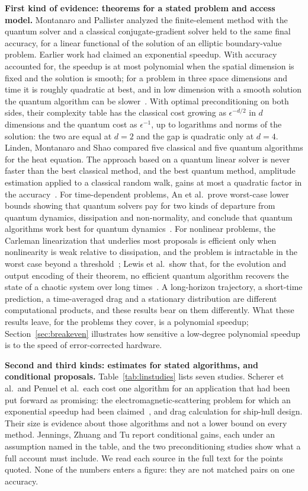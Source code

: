 \textbf{First kind of evidence: theorems for a stated problem and access model.} Montanaro and Pallister analyzed the finite-element method with the quantum solver and a classical conjugate-gradient solver held to the same final accuracy, for a linear functional of the solution of an elliptic boundary-value problem. Earlier work had claimed an exponential speedup. With accuracy accounted for, the speedup is at most polynomial when the spatial dimension is fixed and the solution is smooth; for a problem in three space dimensions and time it is roughly quadratic at best, and in low dimension with a smooth solution the quantum algorithm can be slower~\cite{montanaro2016}. With optimal preconditioning on both sides, their complexity table has the classical cost growing as $\epsilon^{-d/2}$ in $d$ dimensions and the quantum cost as $\epsilon^{-1}$, up to logarithms and norms of the solution: the two are equal at $d=2$ and the gap is quadratic only at $d=4$. Linden, Montanaro and Shao compared five classical and five quantum algorithms for the heat equation. The approach based on a quantum linear solver is never faster than the best classical method, and the best quantum method, amplitude estimation applied to a classical random walk, gains at most a quadratic factor in the accuracy~\cite{linden2022}. For time-dependent problems, An et al.\ prove worst-case lower bounds showing that quantum solvers pay for two kinds of departure from quantum dynamics, dissipation and non-normality, and conclude that quantum algorithms work best for quantum dynamics~\cite{an2025}. For nonlinear problems, the Carleman linearization that underlies most proposals is efficient only when nonlinearity is weak relative to dissipation, and the problem is intractable in the worst case beyond a threshold~\cite{liu2021c}; Lewis et al.\ show that, for the evolution and output encoding of their theorem, no efficient quantum algorithm recovers the state of a chaotic system over long times~\cite{lewis2024}. A long-horizon trajectory, a short-time prediction, a time-averaged drag and a stationary distribution are different computational products, and these results bear on them differently. What these results leave, for the problems they cover, is a polynomial speedup; Section~\ref{sec:breakeven} illustrates how sensitive a low-degree polynomial speedup is to the speed of error-corrected hardware.

\textbf{Second and third kinds: estimates for stated algorithms, and conditional proposals.} Table~\ref{tab:linstudies} lists seven studies. Scherer et al.\ and Penuel et al.\ each cost one algorithm for an application that had been put forward as promising: the electromagnetic-scattering problem for which an exponential speedup had been claimed~\cite{clader2013}, and drag calculation for ship-hull design. Their size is evidence about those algorithms and not a lower bound on every method. Jennings, Zhuang and Tu report conditional gains, each under an assumption named in the table, and the two preconditioning studies show what a full account must include. We read each source in the full text for the points quoted. None of the numbers enters a figure: they are not matched pairs on one accuracy.

